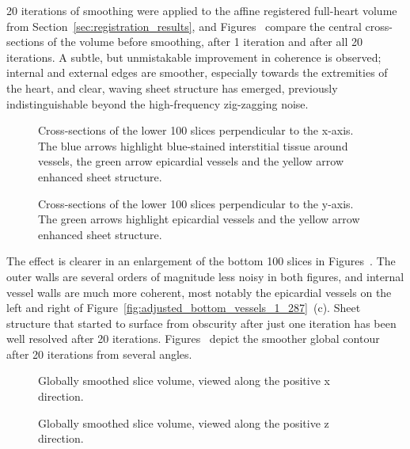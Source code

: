     20 iterations of smoothing were applied to the affine registered full-heart volume from Section~\ref{sec:registration_results}, and Figures~ compare the central cross-sections of the volume before smoothing, after 1 iteration and after all 20 iterations. A subtle, but unmistakable improvement in coherence is observed; internal and external edges are smoother, especially towards the extremities of the heart, and clear, waving sheet structure has emerged, previously indistinguishable beyond the high-frequency zig-zagging noise.
    
    \begin{figure}[htbp]
      \caption{Cross-sections of the lower 100 slices perpendicular to the x-axis. The blue arrows highlight blue-stained interstitial tissue around vessels, the green arrow epicardial vessels and the yellow arrow enhanced sheet structure.}
    \end{figure}

    \begin{figure}[htbp]
      \caption{Cross-sections of the lower 100 slices perpendicular to the y-axis. The green arrows highlight epicardial vessels and the yellow arrow enhanced sheet structure.}
    \end{figure}
    
    The effect is clearer in an enlargement of the bottom 100 slices in Figures~. The outer walls are several orders of magnitude less noisy in both figures, and internal vessel walls are much more coherent, most notably the epicardial vessels on the left and right of Figure~\ref{fig:adjusted_bottom_vessels_1_287}~(c). Sheet structure that started to surface from obscurity after just one iteration has been well resolved after 20 iterations. Figures~ depict the smoother global contour after 20 iterations from several angles.
    
    \begin{figure}[p]
      \caption{Globally smoothed slice volume, viewed along the positive x direction.}
    \end{figure}

    \begin{figure}[p]
      \caption{Globally smoothed slice volume, viewed along the positive z direction.}
    \end{figure}
  
